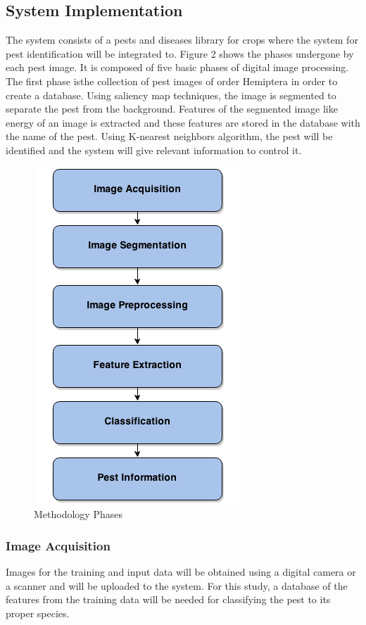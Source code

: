 \documentclass[journal]{./IEEE/IEEEtran}
\begin{document}
\subsection{System Implementation}
	The system consists of a pests and diseases library for crops where the system for pest identification will be integrated to. Figure 2 shows the phases undergone by each pest image. It is composed of five basic phases of digital image processing. The first phase isthe collection of pest images of order Hemiptera in order to create a database. Using saliency map techniques, the image is segmented to separate the pest from the background. Features of the segmented image like energy of an image is extracted and these features are stored in the database with the name of the pest. Using K-nearest neighbors algorithm, the pest will be identified and the system will give relevant information to control it.\\
	\begin{figure}[h!]
  		\centering
		\includegraphics[scale=0.5]{images/flowchart.png}
		\caption{Methodology Phases}
	\end{figure}

	\subsubsection{Image Acquisition}
	Images for the training and input data will be obtained using a digital camera or a scanner and will be uploaded to the system. For this study, a database of the features from the training data will be needed for classifying the pest to its proper species.
\end{document}
